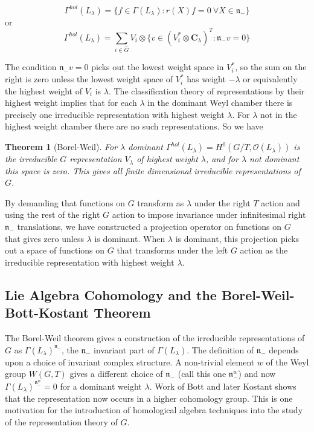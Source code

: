 \documentclass[a4paper,a4paper]{article}
\newtheorem{theorem}{Theorem}
\theoremstyle{conjecture}
\begin{document}
$$\Gamma^{hol}(L_\lambda)=\{f\in \Gamma(L_\lambda): r(X)f=0\ \forall X\in \mathfrak n_-\}$$
or
$$\Gamma^{hol}(L_\lambda)=\sum_{i\in \hat G}V_i\otimes \{v\in(V_i^*\otimes \mathbf C_\lambda)^T
:{\mathfrak n}_- v=0\}$$

The condition ${\mathfrak n}_- v=0$ picks out the lowest weight space in $V_i^*$, so the
sum on the right is zero unless the lowest weight space of $V_i^*$ has weight $-\lambda$ or
equivalently the highest weight of $V_i$ is $\lambda$.  The classification theory of representations
by their highest weight implies that for each $\lambda$ in the dominant Weyl chamber there is
precisely one irreducible representation with highest weight $\lambda$.  For $\lambda$ not in the
highest weight chamber there are no such representations.  So we have

\begin{theorem}[Borel-Weil]
For $\lambda$ dominant $\Gamma^{hol}(L_\lambda)=H^0(G/T,{\mathcal
O}(L_\lambda))$ is the irreducible $G$ representation $V_\lambda$
of highest weight $\lambda$, and for $\lambda$ not dominant this
space is zero.  This gives all finite dimensional irreducible
representations of $G$.
\end{theorem}

By demanding that functions on $G$ transform as $\lambda$ under
the right $T$ action and using the rest of the right $G$ action to
impose invariance under infinitesimal right ${\mathfrak n}_-$
translations, we have constructed a projection operator on
functions on $G$ that gives zero unless $\lambda$ is dominant.
When $\lambda$ is dominant, this projection picks out a space of
functions on $G$ that transforms under the left $G$ action as the
irreducible representation with highest weight $\lambda$.


\subsection{Lie Algebra Cohomology and the Borel-Weil-Bott-Kostant Theorem}

The Borel-Weil theorem gives a construction of the irreducible
representations of $G$ as $\Gamma(L_\lambda)^{\mathfrak{n}_-}$,
the ${\mathfrak{n}_-}$ invariant part of $\Gamma(L_\lambda)$.  The
definition of ${\mathfrak{n}_-}$ depends upon a choice of
invariant complex structure. A non-trivial element $w$ of the Weyl
group $W(G,T)$ gives a different choice of $\mathfrak{n}_-$ (call
this one $\mathfrak{n}_-^w$) and now
$\Gamma(L_\lambda)^{\mathfrak{n}_-^w} =0$ for a dominant weight
$\lambda$.  Work of Bott \cite{Bott1} and later
Kostant \cite{Kostant1} shows that the representation now occurs in
a higher cohomology group.  This is one motivation for the
introduction of homological algebra techniques into the study of
the representation theory of $G$.
\end{document}
